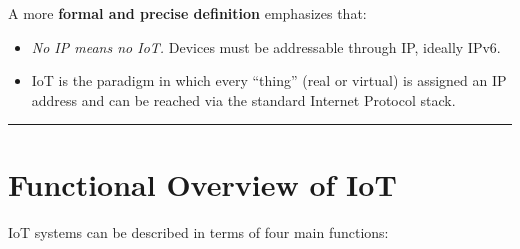\documentclass[a4paper, 12pt]{book} %
\begin{document}
A more \textbf{formal and precise definition} emphasizes that:

\begin{itemize}
\item
  \emph{No IP means no IoT.} Devices must be addressable through IP,
  ideally IPv6.
\item
  IoT is the paradigm in which every ``thing'' (real or virtual) is
  assigned an IP address and can be reached via the standard Internet
  Protocol stack.
\end{itemize}

\begin{center}\rule{0.5\linewidth}{0.5pt}\end{center}

\section{Functional Overview of IoT}\label{functional-overview-of-iot}

IoT systems can be described in terms of four main functions:
\end{document}
